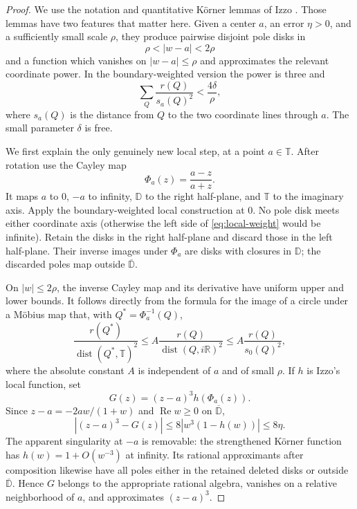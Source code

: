 \documentclass[11pt]{article}
\newcommand{\D}{\mathbb D}
\newcommand{\T}{\mathbb T}
\newcommand{\cl}[1]{\overline{#1}}
\begin{document}
\begin{proof}
We use the notation and quantitative K\"orner lemmas of Izzo
\cite[Lemmas 3.1, 3.5, 4.1, and 6.7]{Izzo}.  Those lemmas have two features
that matter here.  Given a center $a$, an error $\eta>0$, and a sufficiently
small scale $\rho$, they produce pairwise disjoint pole disks in
\[
             \rho<|w-a|<2\rho
\]
and a function which vanishes on $|w-a|\leq\rho$ and approximates the relevant
coordinate power.  In the boundary-weighted version the power is three and
\begin{equation}\label{eq:local-weight}
 \sum_Q\frac{r(Q)}{s_a(Q)^2}<\frac{4\delta}{\rho},
\end{equation}
where $s_a(Q)$ is the distance from $Q$ to the two coordinate lines through
$a$.  The small parameter $\delta$ is free.

We first explain the only genuinely new local step, at a point $a\in\T$.
After rotation use the Cayley map
\[
              \Phi_a(z)=\frac{a-z}{a+z}.
\]
It maps $a$ to $0$, $-a$ to infinity, $\D$ to the right half-plane, and
$\T$ to the imaginary axis.  Apply the boundary-weighted local construction
at $0$.  No pole disk meets either coordinate axis (otherwise the left side
of \eqref{eq:local-weight} would be infinite).  Retain the disks in the right
half-plane and discard those in the left half-plane.  Their inverse images
under $\Phi_a$ are disks with closures in $\D$; the discarded poles map
outside $\cl\D$.

On $|w|\leq2\rho$, the inverse Cayley map and its derivative have uniform
upper and lower bounds.  It follows directly from the formula for the image
of a circle under a M\"obius map that, with $Q^*=\Phi_a^{-1}(Q)$,
\begin{equation}\label{eq:mobius-weight}
 \frac{r(Q^*)}{\operatorname{dist}(Q^*,\T)^2}
 \leq A\frac{r(Q)}{\operatorname{dist}(Q,i\mathbb R)^2}
 \leq A\frac{r(Q)}{s_0(Q)^2},
\end{equation}
where the absolute constant $A$ is independent of $a$ and of small $\rho$.
If $h$ is Izzo's local function, set
\[
              G(z)=(z-a)^3h(\Phi_a(z)).
\]
Since $z-a=-2aw/(1+w)$ and $\operatorname{Re}w\geq0$ on $\cl\D$,
\[
 |(z-a)^3-G(z)|
 \leq 8|w^3(1-h(w))|\leq 8\eta.
\]
The apparent singularity at $-a$ is removable: the strengthened K\"orner
function has $h(w)=1+O(w^{-3})$ at infinity.  Its rational approximants after
composition likewise have all poles either in the retained deleted disks or
outside $\cl\D$.  Hence $G$ belongs to the appropriate rational algebra,
vanishes on a relative neighborhood of $a$, and approximates $(z-a)^3$.


\end{proof}
\end{document}
